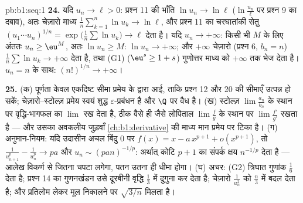 \begin{solution}{pb:b1:seq:1}
\textbf{24.} यदि $u_n \to \ell > 0$: प्रश्न 11 की भाँति $\ln u_n \to
\ln\ell$ ($\ln\frac{u_n}{\ell}$ पर प्रश्न 9 का दबाव), अतः चेज़ारो माध्य
$\frac1n\sum_{k=1}^n \ln u_k \to \ln\ell$, और प्रश्न 11 का चरघातांकी सेतु
$(u_1\cdots u_n)^{1/n} = \exp\bigl(\frac1n\sum\ln u_k\bigr) \to \ell$ देता
है। यदि $u_n \to +\infty$: किसी भी $M$ के लिए अंततः $u_n \geq \eu^M$, अतः
$\ln u_n \geq M$: $\ln u_n \to +\infty$; और $+\infty$ चेज़ारो (प्रश्न 6,
$b_n = n$) $\frac1n\sum \ln u_k \to +\infty$ देता है, तथा (G1) ($\eu^s \geq
1 + s$) गुणोत्तर माध्य को $+\infty$ तक भेज देता है। $u_n = n$ के साथ:
$(n!)^{1/n} \to +\infty$।

\textbf{25.} (क) पूर्णता केवल एकदिष्ट सीमा प्रमेय के द्वारा आई, ताकि प्रश्न
12 और 20 की सीमाएँ उत्पन्न हो सकें; चेज़ारो--स्टोल्ज़ प्रमेय स्वयं शुद्ध
$\varepsilon$-प्रबंधन है और $\Q$ पर वैध है। (ख) स्टोल्ज़ $\lim
\frac{a_n}{b_n}$ के स्थान पर वृद्धि-भागफल का $\lim$ रख देता है, ठीक वैसे ही
जैसे लोपिताल $\lim\frac fg$ के स्थान पर $\lim\frac{f'}{g'}$ रखता है --- और
उसका अवकलीय जुड़वाँ \cref{ch:b1:derivative} की माध्य मान प्रमेय पर टिका है।
(ग) अनुमान-नियम: यदि उदासीन अचल बिंदु $0$ पर $f(x) = x - a\,x^{p+1} +
o(x^{p+1})$, तो $\frac{1}{u_{n+1}^p} - \frac{1}{u_n^p} \to pa$ और $u_n \sim
(pan)^{-1/p}$: अर्थात् कोटि $p + 1$ का संपर्क क्षय $n^{-1/p}$ देता है ---
आलेख विकर्ण से जितना चपटा लगेगा, पतन उतना ही धीमा होगा। (घ) अचर: (G2)
त्रिघात गुणांक $\frac16$ देता है; प्रश्न 14 का गुणनखंडन उसे दूरबीनी वृद्धि
$\frac13$ में दुगुना कर देता है; चेज़ारो $\frac{1}{u_n^2}$ को $\frac n3$ में
बदल देता है; और प्रतिलोम लेकर मूल निकालने पर $\sqrt{3/n}$ मिलता है।
\end{solution}
